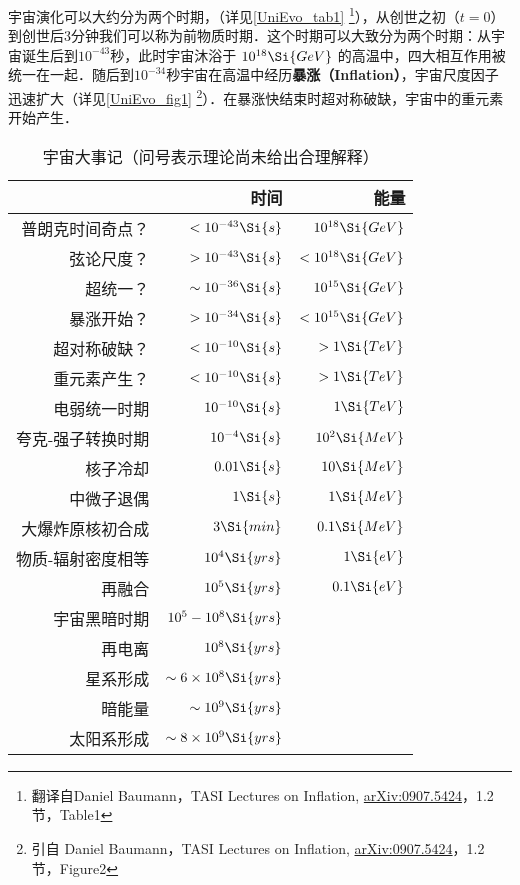
宇宙演化可以大约分为两个时期，（详见\autoref{UniEvo_tab1} \footnote{翻译自Daniel Baumann，TASI Lectures on Inflation, \href{https://arxiv.org/abs/0907.5424}{arXiv:0907.5424}，1.2 节，Table1}），从创世之初（$t=0$） 到创世后3分钟我们可以称为前物质时期．这个时期可以大致分为两个时期：从宇宙诞生后到$10^{-43}$秒，此时宇宙沐浴于 $10^{18}\Si{GeV}$ 的高温中，四大相互作用被统一在一起．随后到$10^{-34}$秒宇宙在高温中经历\textbf{暴涨（Inflation）}，宇宙尺度因子迅速扩大（详见\autoref{UniEvo_fig1} \footnote{引自 Daniel Baumann，TASI Lectures on Inflation, \href{https://arxiv.org/abs/0907.5424}{arXiv:0907.5424}，1.2 节，Figure2}）．在暴涨快结束时超对称破缺，宇宙中的重元素开始产生．

\begin{table}[ht]
\centering
\caption{宇宙大事记（问号表示理论尚未给出合理解释）}\label{UniEvo_tab1}
\begin{tabular}{|r|r|r|}
\hline
 & 时间 & 能量 \\
\hline
普朗克时间奇点？ & $<10^{-43}\Si{s}$ & $10^{18}\Si{GeV}$ \\
\hline
弦论尺度？       & $>10^{-43}\Si{s}$ & $<10^{18}\Si{GeV}$ \\
\hline
超统一？         & $\sim 10^{-36}\Si{s}$ & $10^{15}\Si{GeV}$ \\
\hline
暴涨开始？       & $>10^{-34}\Si{s}$ & $<10^{15} \Si{GeV}$ \\
\hline
超对称破缺？     & $<10^{-10}\Si{s}$ & $>1 \Si{TeV}$ \\
\hline
重元素产生？     & $<10^{-10}\Si{s}$ & $>1 \Si{TeV}$ \\
\hline
电弱统一时期    & $10^{-10}\Si{s}$ & $1 \Si{TeV}$ \\
\hline
夸克-强子转换时期 & $10^{-4}\Si{s}$ & $10^2 \Si{MeV}$ \\
\hline
核子冷却        & $0.01\Si{s}$ & $10 \Si{MeV}$ \\
\hline
中微子退偶      & $1 \Si{s}$  & $1 \Si{MeV}$ \\
\hline
大爆炸原核初合成  & $3 \Si{min}$ & $0.1 \Si{MeV}$ \\
\hline
物质-辐射密度相等 & $10^4\Si{yrs}$  & $1 \Si{eV}$ \\
\hline
再融合 & $10^5\Si{yrs}$  & $0.1 \Si{eV}$ \\
\hline
宇宙黑暗时期 & $10^5 - 10^8\Si{yrs}$  &  \\
\hline
再电离 & $10^8\Si{yrs}$  &  \\
\hline
星系形成 & $\sim 6 \times 10^8\Si{yrs}$  &  \\
\hline
暗能量 & $\sim 10^9\Si{yrs}$  &  \\
\hline
太阳系形成 & $ \sim 8 \times 10^9\Si{yrs}$  &  \\
\hline
\end{tabular}
\end{table}

